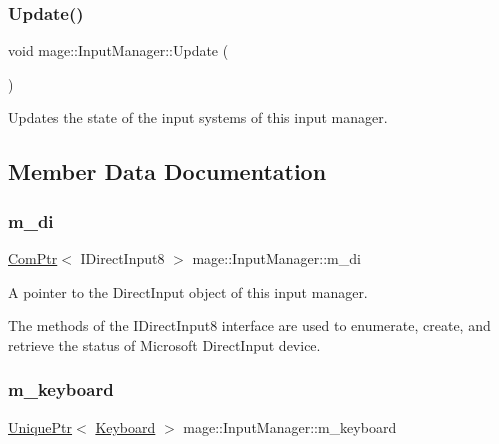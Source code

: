 \subsubsection{\texorpdfstring{Update()}{Update()}}
{\footnotesize\ttfamily void mage\+::\+Input\+Manager\+::\+Update (\begin{DoxyParamCaption}{ }\end{DoxyParamCaption})}

Updates the state of the input systems of this input manager. 

\subsection{Member Data Documentation}
\hypertarget{classmage_1_1_input_manager_a0ffbd0e68b5bab33c35f310625884f3a}{}\label{classmage_1_1_input_manager_a0ffbd0e68b5bab33c35f310625884f3a} 
\subsubsection{\texorpdfstring{m\+\_\+di}{m\_di}}
{\footnotesize\ttfamily \hyperlink{namespacemage_ae74f374780900893caa5555d1031fd79}{Com\+Ptr}$<$ I\+Direct\+Input8 $>$ mage\+::\+Input\+Manager\+::m\+\_\+di\hspace{0.3cm}{\ttfamily [private]}}

A pointer to the Direct\+Input object of this input manager.

The methods of the I\+Direct\+Input8 interface are used to enumerate, create, and retrieve the status of Microsoft Direct\+Input device. \hypertarget{classmage_1_1_input_manager_a196bdd04e169e89d0fa5f6a4a180e4cb}{}\label{classmage_1_1_input_manager_a196bdd04e169e89d0fa5f6a4a180e4cb} 
\subsubsection{\texorpdfstring{m\+\_\+keyboard}{m\_keyboard}}
{\footnotesize\ttfamily \hyperlink{namespacemage_a3316d7143a973e37adf1110f2e80ca31}{Unique\+Ptr}$<$ \hyperlink{classmage_1_1_keyboard}{Keyboard} $>$ mage\+::\+Input\+Manager\+::m\+\_\+keyboard\hspace{0.3cm}{\ttfamily [private]}}

